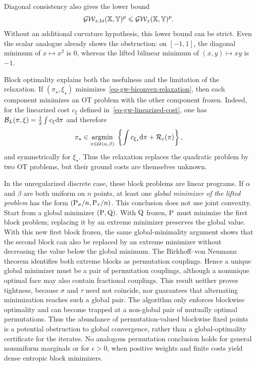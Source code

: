 Diagonal consistency also gives the lower bound
\begin{equation}\label{eq-gw-biconvex-lower-bound}
	\GW_{\epsilon,\mathrm{bi}}(\XX,\YY)^p
	\leq
	\GW_\epsilon(\XX,\YY)^p.
\end{equation}
Without an additional curvature hypothesis, this lower bound can be strict. Even the scalar analogue already shows the obstruction: on $[-1,1]$, the diagonal minimum of $x\mapsto x^2$ is $0$, whereas the lifted bilinear minimum of $(x,y)\mapsto xy$ is $-1$.

Block optimality explains both the usefulness and the limitation of the relaxation. If $(\pi_\star,\xi_\star)$ minimizes~\eqref{eq-gw-biconvex-relaxation}, then each component minimizes an OT problem with the other component frozen. Indeed, for the linearized cost $c_\xi$ defined in~\eqref{eq-gw-linearized-cost}, one has $\mathcal B_L(\pi,\xi)=\frac12\int c_\xi\d\pi$ and therefore
\[
	\pi_\star\in\uargmin{\pi\in\Couplings(\alpha,\beta)}
	\left\{\int c_{\xi_\star}\d\pi+\mathcal R_\epsilon(\pi)\right\},
\]
and symmetrically for $\xi_\star$. Thus the relaxation replaces the quadratic problem by two OT problems, but their ground costs are themselves unknown.

In the unregularized discrete case, these block problems are linear programs. If $\alpha$ and $\beta$ are both uniform on $n$ points, at least one \emph{global minimizer of the lifted problem} has the form $(\P_\sigma/n,\P_\tau/n)$. This conclusion does not use joint convexity. Start from a global minimizer $(\P,\Q)$. With $\Q$ frozen, $\P$ must minimize the first block problem; replacing it by an extreme minimizer preserves the global value. With this new first block frozen, the same global-minimality argument shows that the second block can also be replaced by an extreme minimizer without decreasing the value below the global minimum. The Birkhoff--von Neumann theorem identifies both extreme blocks as permutation couplings. Hence a unique global minimizer must be a pair of permutation couplings, although a nonunique optimal face may also contain fractional couplings. This result neither proves tightness, because $\sigma$ and $\tau$ need not coincide, nor guarantees that alternating minimization reaches such a global pair. The algorithm only enforces blockwise optimality and can become trapped at a non-global pair of mutually optimal permutations. Thus the abundance of permutation-valued blockwise fixed points is a potential obstruction to global convergence, rather than a global-optimality certificate for the iterates. No analogous permutation conclusion holds for general nonuniform marginals or for $\epsilon>0$, when positive weights and finite costs yield dense entropic block minimizers.

